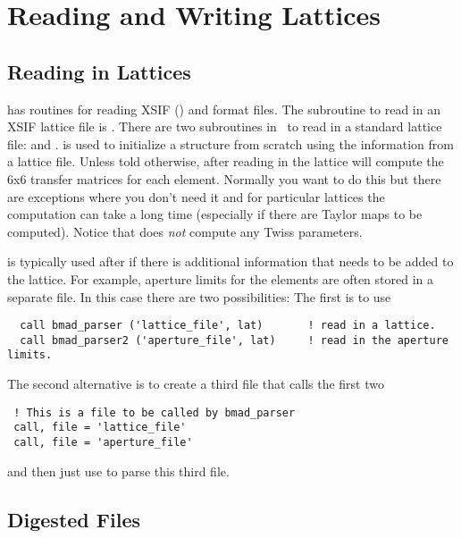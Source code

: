 \chapter{Reading and Writing Lattices}

\section{Reading in Lattices}


\bmad has routines for reading XSIF ()
and \bmad format files.
The subroutine to read in an XSIF lattice file is .
There are two subroutines in \bmad\ to read in a \bmad standard
lattice file:  and .
 is used to initialize a 
structure from scratch using the information from a lattice
file. Unless told otherwise, after reading in the lattice
 will compute the 6x6 transfer matrices for each
element. Normally you want to do this but there are exceptions where
you don't need it and for particular lattices the computation can take
a long time (especially if there are Taylor maps to be
computed). Notice that  does {\em not} compute any
Twiss parameters.

 is typically used after  if there is
additional information that needs to be added to the lattice. For
example, aperture limits for the elements are often stored in a
separate file. In this case there are two possibilities: The first is
to use 
\begin{verbatim}
  call bmad_parser ('lattice_file', lat)       ! read in a lattice.
  call bmad_parser2 ('aperture_file', lat)     ! read in the aperture limits.
\end{verbatim}
The second alternative is to create a third file that calls the first two
\begin{verbatim}
 ! This is a file to be called by bmad_parser
 call, file = 'lattice_file'
 call, file = 'aperture_file'
\end{verbatim}
and then just use  to parse this third file.

\section{Digested Files}

